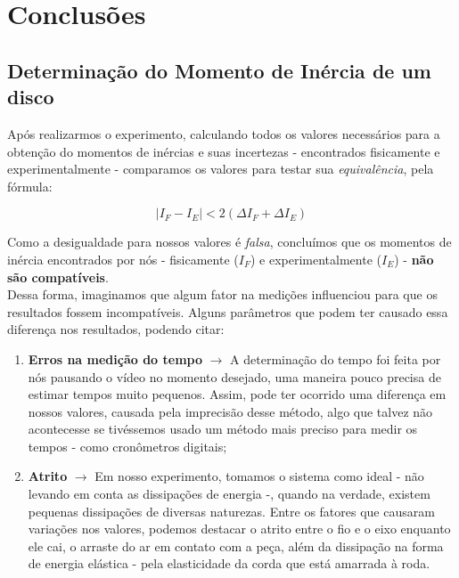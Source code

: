 \newpage
\section{Conclusões}


\subsection{Determinação do Momento de Inércia de um disco}

Após realizarmos o experimento, calculando todos os valores necessários para a obtenção do momentos de inércias e suas incertezas - encontrados fisicamente e experimentalmente - comparamos os valores para testar sua \textit{equivalência}, pela fórmula:

\[| I_F - I_E | < 2 (\Delta I_F + \Delta I_E)\]

Como a desigualdade para nossos valores é \textit{falsa}, concluímos que os momentos de inércia encontrados por nós - fisicamente ($I_F$) e experimentalmente ($I_E$) - \textbf{não são compatíveis}.\\

Dessa forma, imaginamos que algum fator na medições influenciou para que os resultados fossem incompatíveis. Alguns parâmetros que podem ter causado essa diferença nos resultados, podendo citar:

\begin{enumerate}
    \item \textbf{Erros na medição do tempo} $\xrightarrow{}$ A determinação do tempo foi feita por nós pausando o vídeo no momento desejado, uma maneira pouco precisa de estimar tempos muito pequenos. Assim, pode ter ocorrido uma diferença em nossos valores, causada pela imprecisão desse método, algo que talvez não acontecesse se tivéssemos usado um método mais preciso para medir os tempos - como cronômetros digitais;  
    
    \item \textbf{Atrito} $\xrightarrow{}$ Em nosso experimento, tomamos o sistema como ideal - não levando em conta as dissipações de energia -, quando na verdade, existem pequenas dissipações de diversas naturezas. Entre os fatores que causaram variações nos valores, podemos destacar o atrito entre o fio e o eixo enquanto ele cai, o arraste do ar em contato com a peça, além da dissipação na forma de energia elástica - pela elasticidade da corda que está amarrada à roda. 
\end{enumerate}

